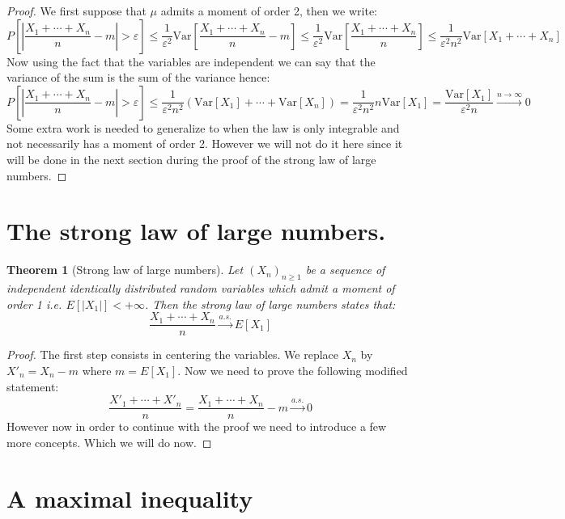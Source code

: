 \documentclass[10pt,a4paper]{book}
\newtheorem{theorem}{Theorem}[section]
\theoremstyle{definition}
\begin{document}
\begin{proof}

We first suppose that $\mu$ admits a moment of order 2, then we write:
\[
P\left[ \left|\frac{X_1 + \cdots + X_n}{n} - m \right| > \varepsilon \right] \leq \frac{1}{\varepsilon^2} \text{Var}\left[ \frac{X_1 + \cdots + X_n}{n} - m \right] \leq \frac{1}{\varepsilon^2} \text{Var}\left[ \frac{X_1 + \cdots + X_n}{n}\right] \leq \frac{1}{\varepsilon^2 n^2} \text{Var}\left[X_1 + \cdots + X_n \right]
\]
Now using the fact that the variables are independent we can say that the variance of the sum is the sum of the variance hence:
\[
P\left[ \left|\frac{X_1 + \cdots + X_n}{n} - m \right| > \varepsilon \right] \leq  \frac{1}{\varepsilon^2 n^2} (\text{Var}[X_1] + \cdots + \text{Var}[X_n]) = \frac{1}{\varepsilon^2 n^2} n \text{Var}[X_1] = \frac{\text{Var}[X_1]}{\varepsilon^2 n} \stackrel{n \to \infty}{\longrightarrow} 0
\]
Some extra work is needed to generalize to when the law is only integrable and not necessarily has a moment of order 2. However we will not do it here since it will be done in the next section during the proof of the strong law of large numbers.
\end{proof}

\section{The strong law of large numbers.}

\begin{theorem}[Strong law of large numbers]
Let $(X_n)_{n \geq 1}$ be a sequence of independent identically distributed random variables which admit a moment of order 1 i.e. $E[|X_1|] < +\infty$. Then the strong law of large numbers states that:
\[
\frac{X_1 + \cdots + X_n}{n} \stackrel{a.s.}{\longrightarrow} E[X_1]
\]
\end{theorem}

\begin{proof}

The first step consists in centering the variables. We replace $X_n$ by $X'_n = X_n - m$ where $m = E[X_1]$. Now we need to prove the following modified statement:
\[
\frac{X'_1 + \cdots + X'_n}{n} = \frac{X_1 + \cdots + X_n}{n} - m \stackrel{a.s.}{\longrightarrow} 0
\]
However now in order to continue with the proof we need to introduce a few more concepts. Which we will do now.
\end{proof}

\section{A maximal inequality}
\end{document}
